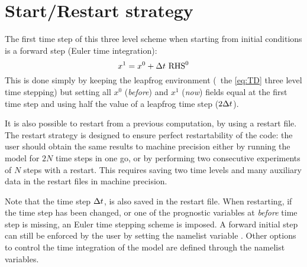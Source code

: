 \documentclass[../main/NEMO_manual]{subfiles}
\begin{document}
\section{Start/Restart strategy}
\label{sec:TD_rst}

\begin{listing}
  \caption{}
  \label{lst:namrun}
\end{listing}

The first time step of this three level scheme when starting from initial conditions is
a forward step (Euler time integration):
\[
  x^1 = x^0 + \Delta t \ \text{RHS}^0
\]
This is done simply by keeping the leapfrog environment
(\ie\ the \autoref{eq:TD} three level time stepping) but
setting all $x^0$ (\textit{before}) and $x^1$ (\textit{now}) fields equal at the first time step and
using half the value of a leapfrog time step ($2 \Delta t$).

It is also possible to restart from a previous computation, by using a restart file.
The restart strategy is designed to ensure perfect restartability of the code:
the user should obtain the same results to machine precision either by
running the model for $2N$ time steps in one go,
or by performing two consecutive experiments of $N$ steps with a restart.
This requires saving two time levels and many auxiliary data in
the restart files in machine precision.

Note that the time step $\Delta t$, is also saved in the restart file.
When restarting, if the time step has been changed, or
one of the prognostic variables at \textit{before} time step is missing,
an Euler time stepping scheme is imposed.
A forward initial step can still be enforced by the user by
setting the namelist variable .
Other options to control the time integration of the model are defined through
the  namelist variables.

\end{document}
